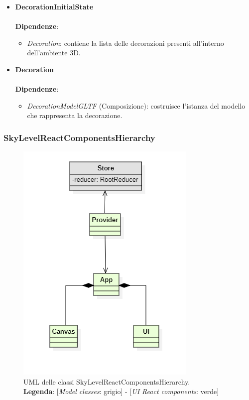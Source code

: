 \begin{itemize}
		\item \textbf{DecorationInitialState}
		\\\\
		\textbf{Dipendenze}:
		\begin{itemize}
			\item \textit{Decoration}: contiene la lista delle decorazioni presenti all'interno dell'ambiente 3D.
		\end{itemize}

		\item \textbf{Decoration}
		\\\\
		\textbf{Dipendenze}:
		\begin{itemize}
			\item \textit{DecorationModelGLTF} (Composizione): costruisce l'istanza del modello che rappresenta la decorazione.
		\end{itemize}
\end{itemize}

\subsubsection{SkyLevelReactComponentsHierarchy}
\begin{figure}[H]
	\centering
	\includegraphics[scale=0.75, keepaspectratio]{./res/images/skyLevelReactComponentHierarchy.PNG}
	\caption[UML delle classi SkyLevelReactComponentsHierarchy]{
	UML delle classi SkyLevelReactComponentsHierarchy.
	\\
	\textbf{Legenda}: 
	[\textit{Model classes}: grigio] -
	[\textit{UI React components}: verde]}
\end{figure}

